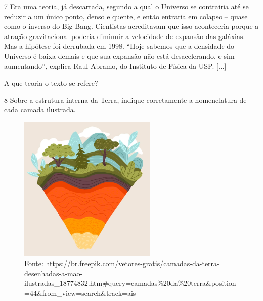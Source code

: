 

\num{7}  Era uma teoria, já descartada, segundo a qual o Universo se contrairia até
  se reduzir a um único ponto, denso e quente, e então entraria em
  colapso -- quase como o inverso do Big Bang. Cientistas acreditavam
  que isso aconteceria porque a atração gravitacional poderia diminuir a
  velocidade de expansão das galáxias. Mas a hipótese foi derrubada em
  1998. ``Hoje sabemos que a densidade do Universo é baixa demais e que
  sua expansão não está desacelerando, e sim aumentando'', explica Raul
  Abramo, do Instituto de Física da USP. [...]


A que teoria o texto se refere?



\num{8} Sobre a estrutura interna da Terra, indique corretamente a nomenclatura de cada camada ilustrada.

\begin{figure}[htpb!]
\includegraphics[width=2.58803in,height=2.75652in]{./imgs/img11.png}
\caption{Fonte: https://br.freepik.com/vetores-gratis/camadas-da-terra-desenhadas-a-mao-ilustradas\_18774832.htm\#query=camadas\%20da\%20terra\&position=44\&from\_view=search\&track=ais}
\end{figure}



